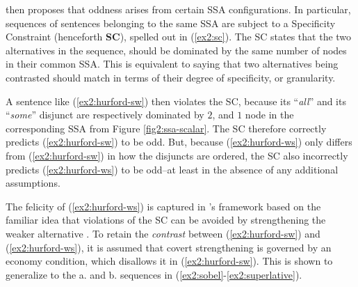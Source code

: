 \textcite{Ippolito2019} then proposes that oddness arises from certain SSA configurations. In particular, sequences of sentences belonging to the same SSA are subject to a Specificity Constraint (henceforth \textbf{SC}), spelled out in (\ref{ex2:sc}). The SC states that the two alternatives in the sequence, should be dominated by the same number of nodes in their common SSA. This is equivalent to saying that two alternatives being contrasted should match in terms of their degree of specificity, or granularity.


\begin{exe}
	\label{ex2:sc}
\end{exe}

A sentence like (\ref{ex2:hurford-sw}) then violates the SC, because its ``\textit{all}'' and its ``\textit{some}'' disjunct are respectively dominated by $2$, and $1$ node in the corresponding SSA from Figure \ref{fig2:ssa-scalar}. The SC therefore correctly predicts (\ref{ex2:hurford-sw}) to be odd. But, because (\ref{ex2:hurford-ws}) only differs from (\ref{ex2:hurford-sw}) in how the disjuncts are ordered, the SC also incorrectly predicts (\ref{ex2:hurford-ws}) to be odd--at least in the absence of any additional assumptions.

The felicity of (\ref{ex2:hurford-ws}) is captured in \textcite{Ippolito2019}'s framework based on the familiar idea that violations of the SC can be avoided by strengthening the weaker alternative \parencite{Gazdar1979,Singh2008a,Singh2008b,Chierchia2009,Fox2018}. To retain the \textit{contrast} between  (\ref{ex2:hurford-sw}) and  (\ref{ex2:hurford-ws}), it is assumed that covert strengthening is governed by an economy condition, which disallows it in (\ref{ex2:hurford-sw}). This is shown to generalize to the a. and b. sequences in (\ref{ex2:sobel}-\ref{ex2:superlative}).


